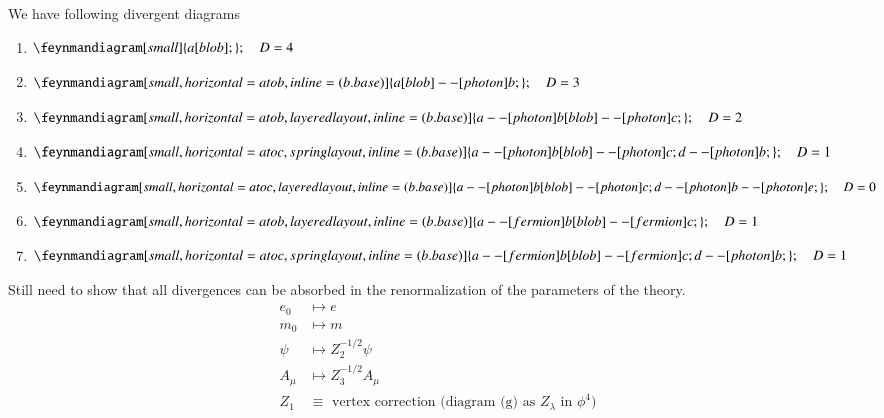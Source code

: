 We have following divergent diagrams
\begin{enumerate}[label=(\alph*)]
	\item \label{item:a} $\begin{aligned}[t]\feynmandiagram[small]{a[blob];}; \quad D &=4 \end{aligned}$
   \item \label{item:b} $\begin{aligned}[t]\feynmandiagram[small, horizontal=a to b, inline=(b.base)]{a[blob] --[photon] b;}; \quad D &=3\end{aligned}$
	\item \label{item:c}$\begin{aligned}[t]\feynmandiagram[small, horizontal=a to b, layered layout, inline=(b.base)]{a --[photon] b[blob] --[photon] c;}; \quad D &=2\end{aligned}$
	\item \label{item:d}$\begin{aligned}[t]\feynmandiagram[small, horizontal=a to c, spring layout, inline=(b.base)]{a --[photon] b[blob] --[photon] c; d --[photon] b;}; \quad D &=1\end{aligned}$
   \item \label{item:e}$\begin{aligned}[t]\feynmandiagram[small, horizontal=a to c, layered layout, inline=(b.base)]{a --[photon] b[blob] --[photon] c; d --[photon] b --[photon] e;}; \quad D &=0\end{aligned}$
	\item \label{item:f}$\begin{aligned}[t]\feynmandiagram[small, horizontal=a to b, layered layout, inline=(b.base)]{a --[fermion] b[blob] --[fermion] c;}; \quad D &=1\end{aligned}$
	\item \label{item:g}$\begin{aligned}[t]\feynmandiagram[small, horizontal=a to c, spring layout, inline=(b.base)]{a --[fermion] b[blob] --[fermion] c; d --[photon] b;}; \quad D &=1\end{aligned}$
\end{enumerate}

Still need to show that all divergences can be absorbed in the renormalization of the parameters of the theory.
\begin{align*}
	e_0 &\longmapsto e \\
	m_0 &\longmapsto m \\
	\psi &\longmapsto Z^{-1/2}_2 \psi \\
	A_\mu &\longmapsto Z^{-1/2}_3 A_\mu \\
	Z_1 &\equiv \text{ vertex correction (diagram (g) as $Z_\lambda$ in $\phi^4$)} 
\end{align*}

